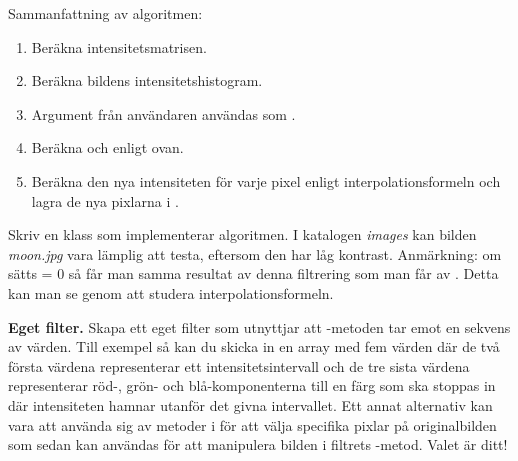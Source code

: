 Sammanfattning av algoritmen:
\begin{enumerate}
	\item Beräkna intensitetsmatrisen.
	\item Beräkna bildens intensitetshistogram.
	\item Argument från användaren användas som .
	\item Beräkna  och  enligt ovan.
	\item Beräkna den nya intensiteten för varje pixel enligt interpolationsformeln och lagra de nya pixlarna i .
\end{enumerate}
Skriv en klass  som implementerar algoritmen. I katalogen \emph{images} kan bilden \emph{moon.jpg} vara lämplig att testa, eftersom den har låg kontrast. Anmärkning: om  sätts = 0 så får man samma resultat av denna filtrering som man får av . Detta kan man se genom att studera interpolationsformeln.

\Task \textbf{Eget filter.} Skapa ett eget filter som utnyttjar att -metoden tar emot en sekvens av värden. Till exempel så kan du skicka in en array med fem värden där de två första värdena representerar ett intensitetsintervall och de tre sista värdena representerar röd-, grön- och blå-komponenterna till en färg som ska stoppas in där intensiteten hamnar utanför det givna intervallet. Ett annat alternativ kan vara att använda sig av metoder i  för att välja specifika pixlar på originalbilden som sedan kan användas för att manipulera bilden i filtrets -metod. Valet är ditt!

